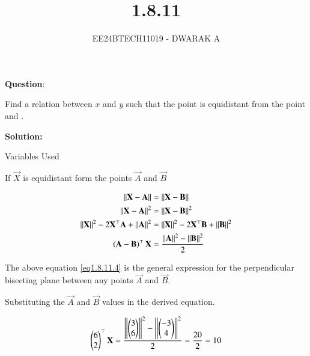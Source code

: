 \documentclass[journal]{IEEEtran}
\begin{document}

\vspace{3cm}

\title{1.8.11}
\author{EE24BTECH11019 - DWARAK A}
{\let\newpage\relax\maketitle}

\renewcommand{\thefigure}{\theenumi}
\renewcommand{\thetable}{\theenumi}
\setlength{\intextsep}{10pt} %


\renewcommand{\thetable}{\theenumi}


\textbf{Question}:

Find a relation between $x$ and $y$ such that the point  is equidistant from the point  and .

\textbf{Solution: }
\begin{table}[h!]    
  \centering
  
  \caption{Variables Used}
  \label{tab1.8.11.1}
\end{table}

If $\vec{X}$ is equidistant form the points $\vec{A}$ and $\vec{B}$

\begin{align}
	\left\lVert\mathbf{X}-\mathbf{A}\right\rVert&=\left\lVert\mathbf{X}-\mathbf{B}\right\rVert \label{eq1.8.11.1}\\
	\left\lVert\mathbf{X}-\mathbf{A}\right\rVert^2&=\left\lVert\mathbf{X}-\mathbf{B}\right\rVert^2 \label{eq1.8.11.2}\\
	\left\lVert\mathbf{X}\right\rVert^2-2\mathbf{X}^\top\mathbf{A}+\left\lVert\mathbf{A}\right\rVert^2&=\left\lVert\mathbf{X}\right\rVert^2-2\mathbf{X}^\top\mathbf{B}+\left\lVert\mathbf{B}\right\rVert^2\label{eq1.8.11.3}\\
	\left(\mathbf{A}-\mathbf{B}\right)^\top\mathbf{X}&=\frac{\left\lVert\mathbf{A}\right\rVert^2-\left\lVert\mathbf{B}\right\rVert^2}{2} \label{eq1.8.11.4}
\end{align}

The above equation \ref{eq1.8.11.4} is the general expression for the perpendicular bisecting plane between any points $\vec{A}$ and $\vec{B}$.

Substituting the $\vec{A}$ and $\vec{B}$ values in the derived equation.

\begin{align}
	\begin{pmatrix}6 \\ 2\end{pmatrix}^\top\mathbf{X} = \frac{\left\lVert\begin{pmatrix}3 \\ 6\end{pmatrix}\right\rVert^2-\left\lVert\begin{pmatrix}-3 \\ 4\end{pmatrix}\right\rVert^2}{2}=\frac{20}{2}=10\label{eq1.8.11.5}
\end{align}
\end{document}
